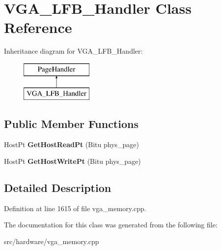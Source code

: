 \hypertarget{classVGA__LFB__Handler}{\section{V\-G\-A\-\_\-\-L\-F\-B\-\_\-\-Handler Class Reference}
\label{classVGA__LFB__Handler}
}
Inheritance diagram for V\-G\-A\-\_\-\-L\-F\-B\-\_\-\-Handler\-:\begin{figure}[H]
\begin{center}
\leavevmode
\includegraphics[height=2.000000cm]{classVGA__LFB__Handler}
\end{center}
\end{figure}
\subsection*{Public Member Functions}
\begin{DoxyCompactItemize}
\item 
\hypertarget{classVGA__LFB__Handler_ad4cf94e4a3b186e307f54fc0ca5f8a33}{Host\-Pt {\bfseries Get\-Host\-Read\-Pt} (Bitu phys\-\_\-page)}\label{classVGA__LFB__Handler_ad4cf94e4a3b186e307f54fc0ca5f8a33}

\item 
\hypertarget{classVGA__LFB__Handler_abc42ff47ee5307b3de27bed8594a1354}{Host\-Pt {\bfseries Get\-Host\-Write\-Pt} (Bitu phys\-\_\-page)}\label{classVGA__LFB__Handler_abc42ff47ee5307b3de27bed8594a1354}

\end{DoxyCompactItemize}


\subsection{Detailed Description}


Definition at line 1615 of file vga\-\_\-memory.\-cpp.



The documentation for this class was generated from the following file\-:\begin{DoxyCompactItemize}
\item 
src/hardware/vga\-\_\-memory.\-cpp\end{DoxyCompactItemize}
